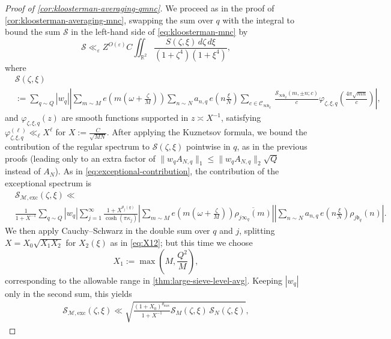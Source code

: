 \documentclass[reqno,11pt]{amsart}
\theoremstyle{remark}
\numberwithin{equation}{section}
\newcommand{\R}{\mathbb{R}}
\newcommand{\mC}{\mathcal{C}}
\newcommand{\mM}{\mathcal{M}}
\newcommand{\mS}{\mathcal{S}}
\newcommand{\mb}{\mathfrak{b}}
\newcommand{\eps}{\varepsilon}
\renewcommand{\bar}{\overline}
\begin{document}
\begin{proof}[Proof of \cref{cor:kloosterman-averaging-qmnc}]
We proceed as in the proof of \cref{cor:kloosterman-averaging-mnc}, swapping the sum over $q$ with the integral to bound the sum $\mS$ in the left-hand side of \cref{eq:kloosterman-mnc} by
\[
    \mS \ll_\eps Z^{O(\eps)} C \iint_{\R^2} \frac{S(\zeta, \xi)\, d\zeta\, d\xi}{(1 + \zeta^4)(1 + \xi^4)},
\]
where
\[
\begin{aligned}
    &\mS(\zeta, \xi) 
    \\
    &:= \sum_{q \sim Q} |w_q| \left\vert \sum_{m \sim M}e\left(m\left(\omega + \frac{\zeta}{M}\right)\right) \sum_{n \sim N} a_{n,q}\, e\left(n\frac{\xi}{N}\right) 
    \sum_{c \in \mC_{\infty\mb_q}}\,
    \frac{\mS_{\infty\mb_q}(m, \pm n; c)}{c} 
    \varphi_{\zeta,\xi,q}\left(\frac{4\pi \sqrt{mn}}{c}\right) \right\vert,
\end{aligned}
\]
and $\varphi_{\zeta,\xi,q}(z)$ are smooth functions supported in $z \asymp X^{-1}$, satisfying $\varphi_{\zeta,\xi,q}^{(\ell)} \ll_\ell X^\ell$ for $X := \frac{C}{\sqrt{MN}}$. After applying the Kuznetsov formula, we bound the contribution of the regular spectrum to $\mS(\zeta, \xi)$ pointwise in $q$, as in the previous proofs (leading only to an extra factor of $\|w_q A_{N,q}\|_1 \le \|w_q A_{N,q}\|_2 \sqrt{Q}$ instead of $A_N$). As in \cref{eq:exceptional-contribution}, the contribution of the exceptional spectrum is
\[
\begin{aligned}
    &\mS_{\mM,\text{exc}}(\zeta, \xi) 
    \ll 
    \\
    &\frac{1}{1+X^{-1}}
    \sum_{q \sim Q} |w_q|
    \sum_{j=1}^\infty \frac{1 + X^{\theta_j(q)}}{\cosh(\pi \kappa_j)} 
    \left\vert \sum_{m \sim M} e\left(m \left(\omega + \frac{\zeta}{M}\right) \right) \bar{\rho_{j\infty_q}(m)} \right\vert \left\vert \sum_{n \sim N} a_{n,q}\, e\left(n\frac{\xi}{N}\right)
    \rho_{j\mb_q}(n)\right\vert.
\end{aligned}
\]
We then apply Cauchy--Schwarz in the double sum over $q$ and $j$, splitting $X = X_0 \sqrt{X_1 X_2}$ for $X_2(\xi)$ as in \cref{eq:X12}; but this time we choose
\begin{equation} \label{eq:final-X1-choice}
    X_1 := \max\left(M, \frac{Q^2}{M}\right),
\end{equation}
corresponding to the allowable range in \cref{thm:large-sieve-level-avg}. Keeping $|w_q|$ only in the second sum, this yields
\[
\begin{aligned}
    \mS_{\mM,\text{exc}}(\zeta, \xi) 
    \ll 
    \sqrt{\frac{(1 + X_0)^{\theta_{\max}}}{1+X^{-1}} \mS_M(\zeta, \xi)\, \mS_N(\zeta, \xi)},

\end{aligned}\]
\end{proof}
\end{document}
